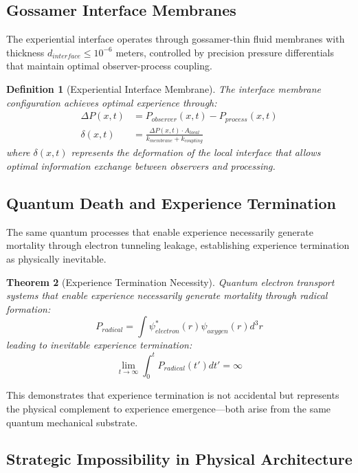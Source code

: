\documentclass{article}
\newtheorem{theorem}{Theorem}[section]
\newtheorem{definition}[theorem]{Definition}
\begin{document}
\subsection{Gossamer Interface Membranes}

The experiential interface operates through gossamer-thin fluid membranes with thickness $d_{interface} \leq 10^{-6}$ meters, controlled by precision pressure differentials that maintain optimal observer-process coupling.

\begin{definition}[Experiential Interface Membrane]
The interface membrane configuration achieves optimal experience through:
\begin{align}
\Delta P(x,t) &= P_{observer}(x,t) - P_{process}(x,t) \\
\delta(x,t) &= \frac{\Delta P(x,t) \cdot A_{local}}{k_{membrane} + k_{coupling}}
\end{align}
where $\delta(x,t)$ represents the deformation of the local interface that allows optimal information exchange between observers and processing.
\end{definition}

\subsection{Quantum Death and Experience Termination}

The same quantum processes that enable experience necessarily generate mortality through electron tunneling leakage, establishing experience termination as physically inevitable.

\begin{theorem}[Experience Termination Necessity]
Quantum electron transport systems that enable experience necessarily generate mortality through radical formation:
$$P_{radical} = \int \psi_{electron}^*(r) \psi_{oxygen}(r) d^3r$$
leading to inevitable experience termination:
$$\lim_{t \rightarrow \infty} \int_0^t P_{radical}(t') dt' = \infty$$
\end{theorem}

This demonstrates that experience termination is not accidental but represents the physical complement to experience emergence—both arise from the same quantum mechanical substrate.

\subsection{Strategic Impossibility in Physical Architecture}
\end{document}
